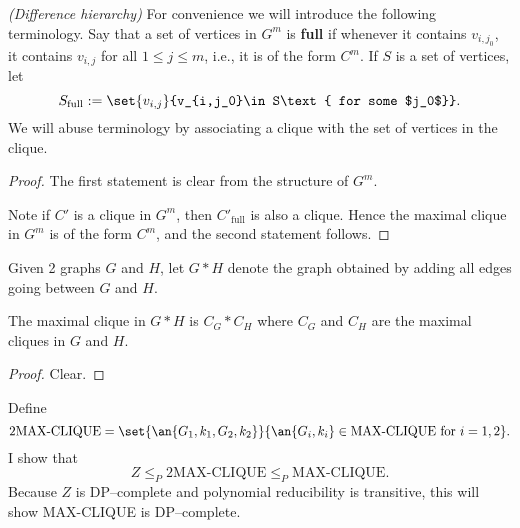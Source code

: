 \begin{problem}{\it(Difference hierarchy)}
For convenience we will introduce the following terminology. Say that a set of vertices in $G^m$ is \textbf{full} if whenever it contains $v_{i,j_0}$, it contains $v_{i,j}$ for all $1\le j\le m$, i.e., it is of the form $C^m$. If $S$ is a set of vertices, let 
\[
S_{\text{full}}:=\set{v_{i,j}}{v_{i,j_0}\in S\text{ for some $j_0$}}.
\]
We will abuse terminology by associating a clique with the set of vertices in the clique.
\begin{proof}
The first statement is clear from the structure of $G^m$.


Note if $C'$ is a clique in $G^m$, then $C'_{\text{full}}$ is also a clique. Hence the maximal clique in $G^m$ is of the form $C^m$, and the second statement follows.
\end{proof}
Given 2 graphs $G$ and $H$, let $G*H$ denote the graph obtained by adding all edges going between $G$ and $H$.
\begin{lem}
The maximal clique in $G*H$ is $C_G*C_H$ where $C_G$ and $C_H$ are the maximal cliques in $G$ and $H$.
\end{lem}
\begin{proof}
Clear.
\end{proof}


Define
\[
2\text{MAX-CLIQUE}=\set{\an{G_1,k_1,G_2,k_2}}{\an{G_i,k_i}\in \text{MAX-CLIQUE}\text{ for }i=1,2}.
\]
I show that 
\[
Z\le_P 2\text{MAX-CLIQUE}\le_P \text{MAX-CLIQUE}.
\]
Because $Z$ is DP--complete and polynomial reducibility is transitive, this will show MAX-CLIQUE is DP--complete.\\


\end{problem}
